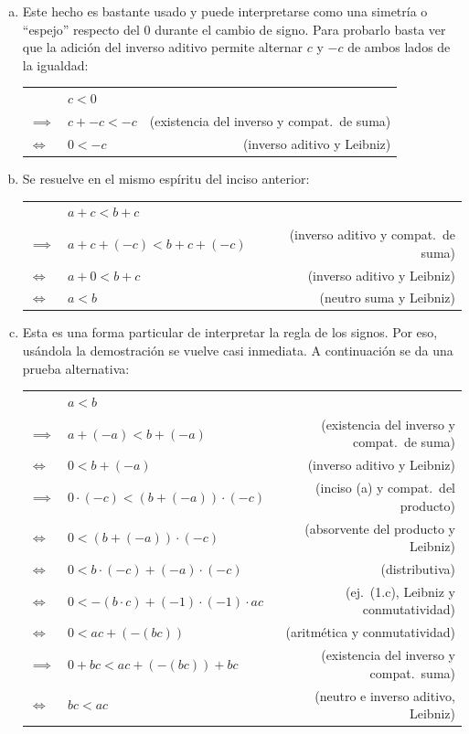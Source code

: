 \begin{enumerate}[(a)]
    \item Este hecho es bastante usado y puede interpretarse como una simetría o ``espejo'' respecto del $0$ durante el cambio de signo.
          Para probarlo basta ver que la adición del inverso aditivo permite alternar $c$ y $-c$ de ambos lados de la igualdad:

          \begin{tabular}{|l l r}
             & $c < 0 $ & \\
            $\implies$ & $c + -c < -c$ & (existencia del inverso y compat.\ de suma) \\
            $\iff$ & $0 < -c$ & (inverso aditivo y Leibniz) \\
          \end{tabular}

    \item Se resuelve en el mismo espíritu del inciso anterior:

          \begin{tabular}{|l l r}
             & $a + c < b + c$ & \\
            $\implies$ & $a + c + (-c) < b + c + (-c)$ & (inverso aditivo y compat.\ de suma) \\
            $\iff$ & $a + 0 < b + c$ & (inverso aditivo y Leibniz) \\
            $\iff$ & $a < b$ & (neutro suma y Leibniz) \\
          \end{tabular}

    \item Esta es una forma particular de interpretar la regla de los signos. Por eso, usándola la demostración se vuelve casi inmediata. A continuación se da una prueba alternativa:
          
          \begin{tabular}{|l l r}
             & $a < b$ & \\
            $\implies$ & $a + (-a) < b + (-a)$ & (existencia del inverso y compat.\ de suma) \\
            $\iff$ & $0 < b + (-a)$ & (inverso aditivo y Leibniz) \\
            $\implies$ & $0 \cdot (-c) < (b + (-a)) \cdot (-c)$ & (inciso (a) y compat.\ del producto) \\
            $\iff$ & $0 < (b + (-a)) \cdot (-c)$ & (absorvente del producto y Leibniz) \\
            $\iff$ & $0 < b \cdot (-c) + (-a) \cdot (-c)$ & (distributiva) \\
            $\iff$ & $0 < -(b \cdot c) + (-1) \cdot (-1) \cdot ac$ & (ej.\ (1.c), Leibniz y conmutatividad) \\
            $\iff$ & $0 < ac + (-(bc))$ & (aritmética y conmutatividad) \\
            $\implies$ & $0 + bc < ac + (-(bc)) + bc$ & (existencia del inverso y compat.\ suma) \\
            $\iff$ & $bc < ac$ & (neutro e inverso aditivo, Leibniz) \\
          \end{tabular}
\end{enumerate}
